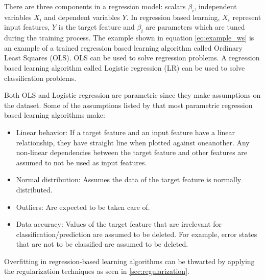 		There are three components in a regression model: scalars $\beta_i$, independent variables $X_i$ and dependent variables $Y$. In regression based learning, $X_i$ represent input features, $Y$ is the target feature and $\beta_i$ are parameters which are tuned during the training process. The example shown in equation \ref{eq:example_ws} is an example of a trained regression based learning algorithm called Ordinary Least Squares (OLS). OLS can be used to solve regression problems. A regression based learning algorithm called Logistic regression (LR) can be used to solve classification problems. 

		Both OLS and Logistic regression are parametric since they make assumptions on the dataset. Some of the assumptions listed by \cite{BOOK:6} that most parametric regression based learning algorithms make:
	\begin{itemize}
		\item{Linear behavior:} If a target feature and an input feature have a linear relationship, they have straight line when plotted against oneanother. Any non-linear dependencies between the target feature and other features are assumed to not be used as input features.
		\item{Normal distribution:} Assumes the data of the target feature is normally distributed.
		\item{Outliers:} Are expected to be taken care of.
		\item{Data accuracy:} Values of the target feature that are irrelevant for classification/prediction are assumed to be deleted. For example, error states that are not to be classified are assumed to be deleted.
	\end{itemize} %

		Overfitting in regression-based learning algorithms can be thwarted by applying the regularization techniques as seen in \ref{sec:regularization}. %

